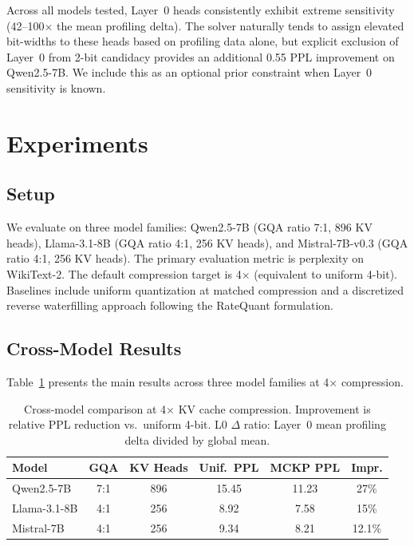 \documentclass[11pt,a4paper]{article}
\begin{document}
Across all models tested, Layer~0 heads consistently exhibit extreme sensitivity (42--100$\times$ the mean profiling delta).
The solver naturally tends to assign elevated bit-widths to these heads based on profiling data alone, but explicit exclusion of Layer~0 from 2-bit candidacy provides an additional 0.55 PPL improvement on Qwen2.5-7B.
We include this as an optional prior constraint when Layer~0 sensitivity is known.

\section{Experiments}
\label{sec:experiments}

\subsection{Setup}

We evaluate on three model families: Qwen2.5-7B (GQA ratio 7:1, 896 KV heads), Llama-3.1-8B (GQA ratio 4:1, 256 KV heads), and Mistral-7B-v0.3 (GQA ratio 4:1, 256 KV heads).
The primary evaluation metric is perplexity on WikiText-2.
The default compression target is 4$\times$ (equivalent to uniform 4-bit).
Baselines include uniform quantization at matched compression and a discretized reverse waterfilling approach following the RateQuant formulation.

\subsection{Cross-Model Results}
\label{sec:cross_model}

Table~\ref{tab:cross_model} presents the main results across three model families at 4$\times$ compression.

\begin{table}[t]
\centering
\small
\caption{Cross-model comparison at 4$\times$ KV cache compression. Improvement is relative PPL reduction vs.\ uniform 4-bit. L0 $\Delta$ ratio: Layer~0 mean profiling delta divided by global mean.}
\label{tab:cross_model}
\begin{tabular}{lccccc}
\toprule
\textbf{Model} & \textbf{GQA} & \textbf{KV Heads} & \textbf{Unif.\ PPL} & \textbf{MCKP PPL} & \textbf{Impr.} \\
\midrule
Qwen2.5-7B    & 7:1 & 896 & 15.45 & 11.23 & 27\% \\
Llama-3.1-8B  & 4:1 & 256 &  8.92 &  7.58 & 15\% \\
Mistral-7B    & 4:1 & 256 &  9.34 &  8.21 & 12.1\% \\
\bottomrule
\end{tabular}
\end{table}
\end{document}
